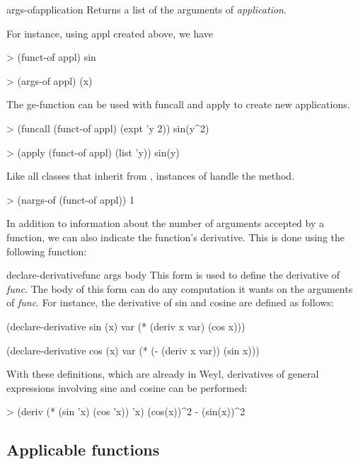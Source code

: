 \begin{functiondef}{args-of}{application}
Returns a list of the arguments of {\em application}.
\end{functiondef}
  
For instance, using appl created above, we have
\begin{code}
> (funct-of appl)
sin
  
> (args-of appl)
(x)
\end{code}
  
The {\sf ge-function} can be used with {\sf funcall} and {\sf apply}
to create new applications. 
\begin{code}
> (funcall (funct-of appl) (expt 'y 2))
sin(y^2)
  
> (apply (funct-of appl) (list 'y))
sin(y)
\end{code}
  
Like all classes that inherit from , instances
of  handle the  method.
\begin{code}  
> (nargs-of (funct-of appl))
1
\end{code}
  
In addition to information about the number of arguments accepted by a
function, we can also indicate the function's derivative. This is
done using the following function:
  
\begin{functiondef}{declare-derivative}{func args \body body}
This form is used to define the derivative of {\em func}. The body of
this form can do any computation it wants on the arguments of {\em
func}. For instance, the derivative of sin and cosine are defined as
follows: 
\begin{code}
(declare-derivative sin (x) var 
  (* (deriv x var) (cos x)))

(declare-derivative cos (x) var
  (* (- (deriv x var)) (sin x)))
\end{code}
\end{functiondef}
  
With these definitions, which are already in Weyl, derivatives of
general expressions involving sine and cosine can be performed:
\begin{code}  
> (deriv (* (sin 'x) (cos 'x)) 'x)
(cos(x))^2 - (sin(x))^2
\end{code}
  
\subsection{Applicable functions}
  
